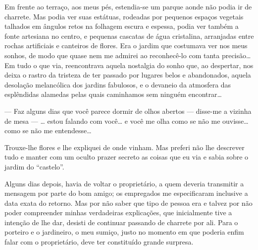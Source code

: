 Em frente ao terraço, aos meus pés, estendia-se um parque aonde não
podia ir de charrete. Mas podia ver suas estátuas, rodeadas por pequenos
espaços vegetais talhados em ângulos retos na folhagem escura e espessa,
podia ver também a fonte artesiana no centro, e pequenas cascatas de
água cristalina, arranjadas entre rochas artificiais e canteiros de
flores. Era o jardim que costumava ver nos meus sonhos, de modo que
quase nem me admirei ao reconhecê-lo com tanta precisão\ldots{} Em tudo
o que via, reencontrava aquela nostalgia do sonho que, ao despertar, nos
deixa o rastro da tristeza de ter passado por lugares belos e
abandonados, aquela desolação melancólica dos jardins fabulosos, e o
devaneio da atmosfera das esplêndidas alamedas pelas quais caminhamos
sem ninguém encontrar\ldots{}



--- Faz alguns dias que você parece dormir de olhos abertos --- disse-me
a vizinha de mesa --- \ldots{} estou falando com você\ldots{} e você me
olha como se não me ouvisse\ldots{} como se não me entendesse\ldots{}

Trouxe-lhe flores e lhe expliquei de onde vinham. Mas preferi não lhe
descrever tudo e manter com um oculto prazer secreto as coisas que eu
via e sabia sobre o jardim do ``castelo''.

Alguns dias depois, havia de voltar o proprietário, a quem deveria
transmitir a mensagem por parte do bom amigo; os empregados me
especificaram inclusive a data exata do retorno. Mas por não saber que
tipo de pessoa era e talvez por não poder compreender minhas verdadeiras
explicações, que inicialmente tive a intenção de lhe dar, desisti de
continuar passando de charrete por ali. Para o porteiro e o jardineiro,
o meu sumiço, justo no momento em que poderia enfim falar com o
proprietário, deve ter constituído grande surpresa.

